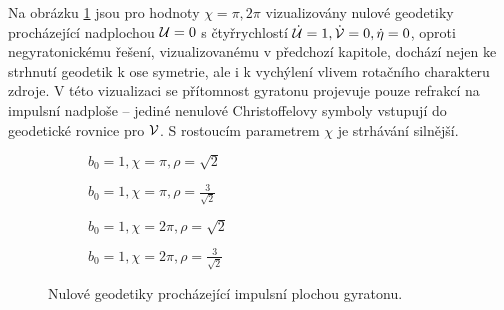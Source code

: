 Na obrázku \ref{fig:gyra_flat_null_b1_chi1_2} jsou pro hodnoty $\chi = \pi, 2\pi$ vizualizovány nulové geodetiky procházející nadplochou $\mathcal{U} = 0$ s
čtyřrychlostí $\dot{\mathcal{U}} = 1, \dot{\mathcal{V}} = 0, \dot{\eta} = 0$, oproti negyratonickému řešení, vizualizovanému v předchozí kapitole, dochází
nejen ke strhnutí geodetik k ose symetrie, ale i k vychýlení vlivem rotačního charakteru zdroje. V této vizualizaci se
přítomnost gyratonu projevuje pouze refrakcí na impulsní nadploše -- jediné nenulové Christoffelovy symboly vstupují do geodetické rovnice pro $\mathcal{V}$.
S rostoucím parametrem $\chi$ je strhávání silnější.
\begin{figure}[ht]
    \centering
    \begin{subfigure}[b]{0.48\textwidth}
         \caption{$b_0=1, \chi=\pi, \rho=\sqrt{2}$} 
    \end{subfigure}
    \begin{subfigure}[b]{0.48\textwidth}
         \caption{$b_0=1, \chi=\pi, \rho=\frac{3}{\sqrt{2}}$} 
    \end{subfigure}
    \hfill
    \begin{subfigure}[b]{0.48\textwidth}
         \caption{$b_0=1, \chi=2\pi, \rho=\sqrt{2}$} 
    \end{subfigure}
    \begin{subfigure}[b]{0.48\textwidth}
         \caption{$b_0=1, \chi=2\pi, \rho=\frac{3}{\sqrt{2}}$} 
    \end{subfigure}
    \caption{Nulové geodetiky procházející impulsní plochou gyratonu.}
    \label{fig:gyra_flat_null_b1_chi1_2}
\end{figure}

